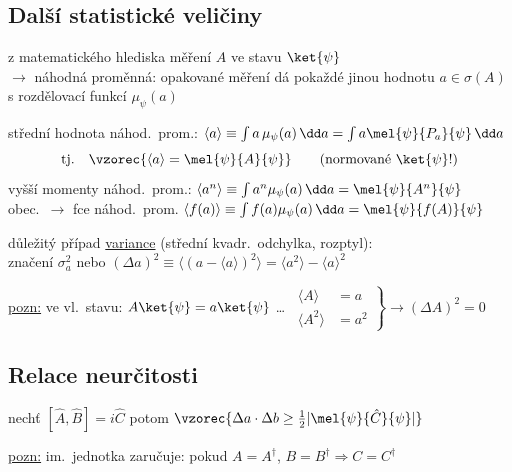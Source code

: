 \subsection*{Další statistické veličiny}
z matematického hlediska měření $A$ ve stavu $\ket{\psi}$ \\
$\to$ náhodná proměnná: opakované měření dá pokaždé jinou hodnotu $a\in\sigma(A)$ s rozdělovací funkcí $\mu_\psi(a)$

střední hodnota náhod.\ prom.: \quad $\langle a\rangle \equiv \int a\,\mu_\psi(a)\,\dd a = \int a\mel{\psi}{P_a}{\psi}\,\dd a$
\[
  \text{tj.}\quad \vzorec{\langle a\rangle = \mel{\psi}{A}{\psi}} \qquad (\text{normované } \ket{\psi}!)
\]
vyšší momenty náhod.\ prom.: \quad $\langle a^n\rangle \equiv \int a^n\mu_\psi(a)\,\dd a = \mel{\psi}{A^n}{\psi}$ \\
obec.\ $\to$ fce náhod.\ prom. \quad $\langle f(a)\rangle \equiv \int f(a)\mu_\psi(a)\,\dd a = \mel{\psi}{f(A)}{\psi}$

důležitý případ \underline{variance} (střední kvadr.\ odchylka, rozptyl): \\
\quad značení $\sigma_a^2$ nebo \quad $(\Delta a)^2 \equiv \big\langle(a - \langle a\rangle)^2\big\rangle = \langle a^2\rangle - \langle a\rangle^2$

\underline{pozn:} ve vl.\ stavu: $A\ket{\psi} = a\ket{\psi}$ \quad \dots\
$\left.\begin{aligned}\langle A\rangle &= a\\ \langle A^2\rangle &= a^2\end{aligned}\right\}\to(\Delta A)^2 = 0$

\subsection*{Relace neurčitosti}
\begin{veta}
nechť $[\hat A,\hat B] = i\hat C$ \quad potom \quad $\vzorec{\Delta a\cdot\Delta b \geq \tfrac12|\mel{\psi}{\hat C}{\psi}|}$
\end{veta}
\underline{pozn:} im.\ jednotka zaručuje: pokud $A = A^\dagger$, $B = B^\dagger\Rightarrow C = C^\dagger$

